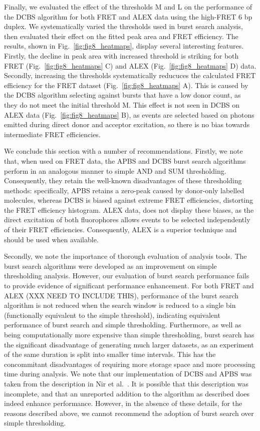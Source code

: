 \documentclass[10pt]{article}
\begin{document}
Finally, we evaluated the effect of the thresholds M and L on the performance of the DCBS algorithm for both FRET and ALEX data using the high-FRET 6 bp duplex. We systematically varied the thresholds used in burst search analysis, then evaluated their effect on the fitted peak area and FRET efficiency. The results, shown in Fig.~\ref{fig:fig8_heatmaps}, display several interesting features. Firstly, the decline in peak area with increased threshold is striking for both FRET (Fig.~\ref{fig:fig8_heatmaps} C) and ALEX (Fig.~\ref{fig:fig8_heatmaps} D) data. Secondly, increasing the thresholds systematically reducuces the calculated FRET efficiency for the FRET dataset (Fig.~\ref{fig:fig8_heatmaps} A). This is caused by the DCBS algorithm selecting against bursts that have a low donor count, as they do not meet the initial threshold M. This effect is not seen in DCBS on ALEX data (Fig.~\ref{fig:fig8_heatmaps} B), as events are selected based on photons emitted during direct donor and acceptor excitation, so there is no bias towards intermediate FRET efficiencies.

We conclude this section with a number of recommendations. Firstly, we note that, when used on FRET data, the APBS and DCBS burst search algorithms perform in an analogous manner to simple AND and SUM thresholding. Consequently, they retain the well-known disadvantages of these thresholding methods: specifically, APBS retains a zero-peak caused by donor-only labelled molecules, whereas DCBS is biased against extreme FRET efficiencies, distorting the FRET efficiency histogram. ALEX data, does not display these biases, as the direct excitation of both fluorophores allows events to be selected independently of their FRET efficiencies. Consequently, ALEX is a superior technique and should be used when available.

Secondly, we note the importance of thorough evaluation of analysis tools. The burst search algorithms were developed as an improvement on simple thresholding analysis. However, our evaluation of burst search performance fails to provide evidence of significant performance enhancement. For both FRET and ALEX (XXX NEED TO INCLUDE THIS), performance of the burst search algorithm is not reduced when the search window is reduced to a single bin (functionally equivalent to the simple threshold), indicating equivalent performance of burst search and simple thresholding. Furthermore, as well as being computationally more expensive than simple thresholding, burst search has the significant disadvantage of generating much larger datasets, as an experiment of the same duration is split into smaller time intervals. This has the concommitant disadvantages of requiring more storage space and more processing time during analysis. We note that our implementation of DCBS and APBS was taken from the description in Nir et al.~\cite{nir06}. It is possible that this description was incomplete, and that an unreported addition to the algorithm as described does indeed enhance performance. However, in the absence of these details, for the reasons described above, we cannot recommend the adoption of burst search over simple thresholding.
\end{document}
